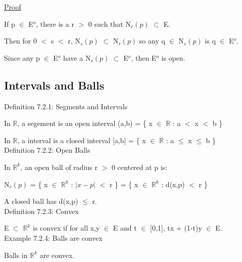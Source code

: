 { \color{magenta} \underline{Proof} }

	If p $\in$ E$^o$, there is a r $>$ 0 such that
	N$_r(p)$ $\subset$ E.

	Then for 0 $<$ s $<$ r, N$_s(p)$ $\subset$ N$_r(p)$
	so any q $\in$ N$_s(p)$ is q $\in$ E$^o$.

	Since any p $\in$ E$^o$ have a N$_s(p)$ $\subset$ E$^o$,
	then E$^o$ is open.


\subsection{ Intervals and Balls } 

{ \color{blue} Definition 7.2.1: Segments and Intervals } 

	\begin{adjustbox}{minipage=14cm, right, vspace=0.1cm 0cm}
		In $\mathbb{R}$, a {\color{lblue} segement} is an open interval
		(a,b) = \{ x $\in$ $\mathbb{R}$ : a $<$ x $<$ b \}

		In $\mathbb{R}$, a {\color{lblue} interval} is a closed interval
		[a,b] = \{ x $\in$ $\mathbb{R}$ : a $\leq$ x $\leq$ b \} \\
	\end{adjustbox}

{ \color{blue} Definition 7.2.2: Open Balls } 

	\begin{adjustbox}{minipage=14cm, right, vspace=0.1cm 0cm}
		In $\mathbb{R}^k$, an {\color{lblue} open ball} of radius
		r $>$ 0 centered at p is:

		\qquad N$_r(p)$ = \{ x $\in$ $\mathbb{R}^k$ : $|x-p|$ $<$ r \}
		= \{ x $\in$ $\mathbb{R}^k$ : d(x,p) $<$ r \}

		A {\color{lblue} closed ball} has d(x,p) $\leq$ r. \\
	\end{adjustbox}

{ \color{blue} Definition 7.2.3: Convex } 

	\begin{adjustbox}{minipage=14cm, right, vspace=0.1cm 0cm}
		E $\subset$ $\mathbb{R}^k$ is {\color{lblue} convex} if for all
		x,y $\in$ E and t $\in$ [0,1], tx + (1-t)y $\in$ E. \\
	\end{adjustbox}

{ \color{purple} Example 7.2.4: Balls are convex }

	\begin{adjustbox}{minipage=14cm, right, vspace=0.1cm 0cm}
		Balls in $\mathbb{R}^k$ are convex.
	\end{adjustbox}


